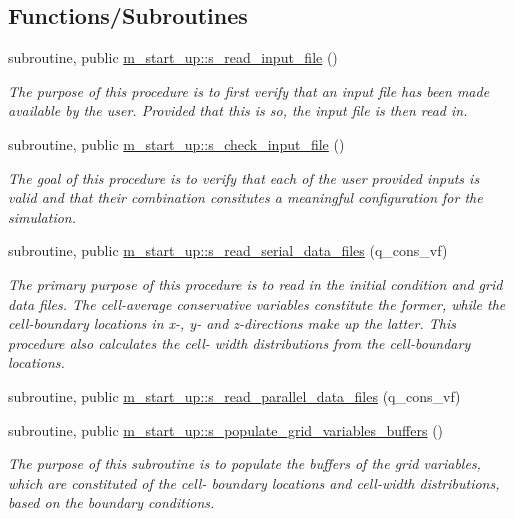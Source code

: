 \subsection*{Functions/\+Subroutines}
\begin{DoxyCompactItemize}
\item 
subroutine, public \hyperlink{namespacem__start__up_ae0571e78c0179c22d3811df31c33c321}{m\+\_\+start\+\_\+up\+::s\+\_\+read\+\_\+input\+\_\+file} ()
\begin{DoxyCompactList}\small\item\em The purpose of this procedure is to first verify that an input file has been made available by the user. Provided that this is so, the input file is then read in. \end{DoxyCompactList}\item 
subroutine, public \hyperlink{namespacem__start__up_ab5f7e03f1da1999ee699cec4f26370e0}{m\+\_\+start\+\_\+up\+::s\+\_\+check\+\_\+input\+\_\+file} ()
\begin{DoxyCompactList}\small\item\em The goal of this procedure is to verify that each of the user provided inputs is valid and that their combination consitutes a meaningful configuration for the simulation. \end{DoxyCompactList}\item 
subroutine, public \hyperlink{namespacem__start__up_abd3c3fd9fbb80ef2ddaf82945c1c1af9}{m\+\_\+start\+\_\+up\+::s\+\_\+read\+\_\+serial\+\_\+data\+\_\+files} (q\+\_\+cons\+\_\+vf)
\begin{DoxyCompactList}\small\item\em The primary purpose of this procedure is to read in the initial condition and grid data files. The cell-\/average conservative variables constitute the former, while the cell-\/boundary locations in x-\/, y-\/ and z-\/directions make up the latter. This procedure also calculates the cell-\/ width distributions from the cell-\/boundary locations. \end{DoxyCompactList}\item 
subroutine, public \hyperlink{namespacem__start__up_a45c8fef6680263063a1c7d2fa1748013}{m\+\_\+start\+\_\+up\+::s\+\_\+read\+\_\+parallel\+\_\+data\+\_\+files} (q\+\_\+cons\+\_\+vf)
\item 
subroutine, public \hyperlink{namespacem__start__up_afd813d91357dc4664a58c690e935ccbd}{m\+\_\+start\+\_\+up\+::s\+\_\+populate\+\_\+grid\+\_\+variables\+\_\+buffers} ()
\begin{DoxyCompactList}\small\item\em The purpose of this subroutine is to populate the buffers of the grid variables, which are constituted of the cell-\/ boundary locations and cell-\/width distributions, based on the boundary conditions. \end{DoxyCompactList}\item 

\end{DoxyCompactItemize}

